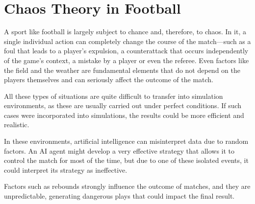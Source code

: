 \section{Chaos Theory in Football}

A sport like football is largely subject to chance and, therefore, to chaos. In it, a single individual action can completely change the course of the match—such as a foul that leads to a player's expulsion, a counterattack that occurs independently of the game's context, a mistake by a player or even the referee. Even factors like the field and the weather are fundamental elements that do not depend on the players themselves and can seriously affect the outcome of the match.

All these types of situations are quite difficult to transfer into simulation environments, as these are usually carried out under perfect conditions. If such cases were incorporated into simulations, the results could be more efficient and realistic.

In these environments, artificial intelligence can misinterpret data due to random factors. An AI agent might develop a very effective strategy that allows it to control the match for most of the time, but due to one of these isolated events, it could interpret its strategy as ineffective.

Factors such as rebounds strongly influence the outcome of matches, and they are unpredictable, generating dangerous plays that could impact the final result.



